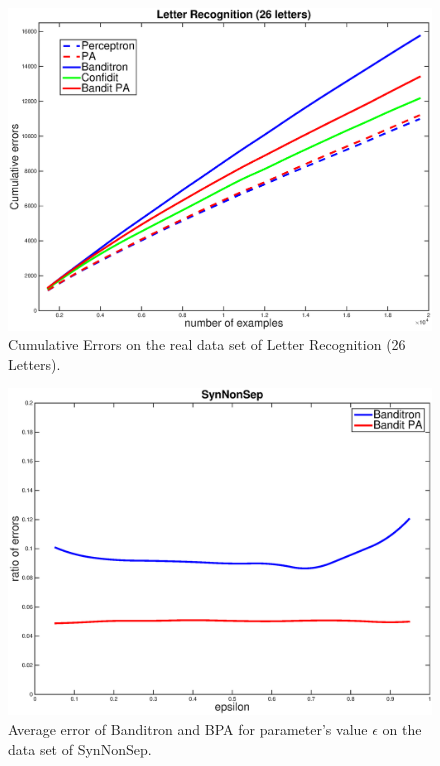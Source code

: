\documentclass[preprint,12pt,authoryear]{elsarticle}
\begin{document}
\begin{figure}[h!]
	\centerline{
		\includegraphics[scale = 0.4]{figs/26LR.eps}}
	\caption{Cumulative Errors  on the real data set of Letter Recognition (26 Letters).}
	\label{pic:BPALR26}
\end{figure}

\begin{figure}[h!]
	\centerline{
		\includegraphics[scale = 0.4]{figs/SynNonSep_gamma.eps}}
	\caption{Average error of Banditron and BPA for parameter's value $\epsilon$ on the data set of SynNonSep. }
	\label{pic:BPASNSerr}
\end{figure}
\end{document}
